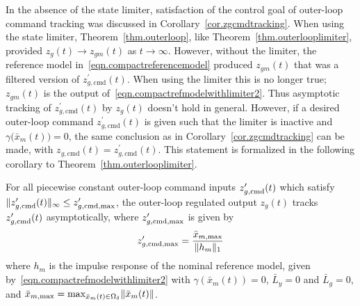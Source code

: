 \documentclass[journal]{IEEEtran}
\theoremstyle{innercustomthm}
\begin{document}
  In the absence of the state limiter, satisfaction of the control goal of outer-loop command tracking was discussed in Corollary~\ref{cor.zgcmdtracking}.
  When using the state limiter, Theorem~\ref{thm.outerloop}, like Theorem~\ref{thm.outerlooplimiter}, provided $z_{g}(t)\rightarrow z_{gm}(t)$ as $t\rightarrow\infty$.
  However, without the limiter, the reference model in\ \eqref{eqn.compactreferencemodel} produced $z_{gm}(t)$ that was a filtered version of $z_{g,\text{cmd}}^{\prime}(t)$.
  When using the limiter this is no longer true; $z_{gm}(t)$ is the output of\ \eqref{eqn.compactrefmodelwithlimiter2}.
  Thus asymptotic tracking of $z_{g,\text{cmd}}^{\prime}(t)$ by $z_{g}(t)$ doesn't hold in general.
  However, if a desired outer-loop command $z_{g,\text{cmd}}^{\prime}(t)$ is given such that the limiter is inactive and $\gamma\bigr(\bar{x}_{m}(t)\bigr)=0$, the same conclusion as in Corollary~\ref{cor.zgcmdtracking} can be made, with $z_{g,\text{cmd}}(t) = z_{g,\text{cmd}}^{\prime}(t)$.
  This statement is formalized in the following corollary to Theorem~\ref{thm.outerlooplimiter}.

  \begin{cor-dan}\label{cor.notForcingLimiting}
    For all piecewise constant outer-loop command inputs $z_{g,\text{\rm{cmd}}}^{\prime}(t)$ which satisfy $\|z_{g,\text{\rm{cmd}}}^{\prime}(t)\|_{\infty}\leq z_{g,\text{\rm{cmd,max}}}^{\prime}$, the outer-loop regulated output $z_{g}(t)$ tracks $z_{g,\text{\rm{cmd}}}^{\prime}(t)$ asymptotically, where $z_{g,\text{\rm{cmd,max}}}^{\prime}$ is given by
    \begin{equation}
      \label{eqn.zgcmdprimemax}
      z_{g,\text{\rm{cmd,max}}}^{\prime}
      =
      \frac{\bar{x}_{m,\text{\rm{max}}}}{\|h_{m}\|_{1}}
    \end{equation}
    where $h_{m}$ is the impulse response of the nominal reference model, given by\ \eqref{eqn.compactrefmodelwithlimiter2} with $\gamma(\bar{x}_{m}(t))=0$, $\bar{L}_{y}=0$ and $\bar{L}_{g}=0$, and $\bar{x}_{m,\text{\rm{max}}}=\text{\rm{max}}_{\bar{x}_{m}(t)\in\Omega_{\delta}}\|\bar{x}_{m}(t)\|$.
  \end{cor-dan}
\end{document}
